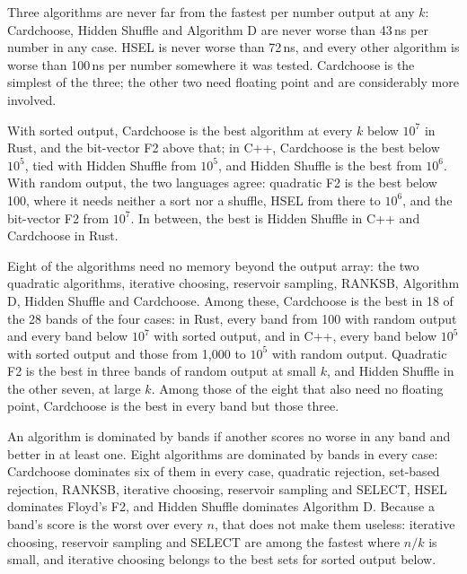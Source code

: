 \documentclass[letterpaper,11pt]{article}
\begin{document}
\begin{table}
    \small
    
    \caption{Rust, sorted order: the best algorithms by worst time per
    number output in each band of \(k\)}\label{bandsrustsorted}
\end{table}

Three algorithms are never far from the fastest per number output at
any \(k\): Cardchoose, Hidden Shuffle and Algorithm D are never worse
than 43\,ns per number in any case. HSEL is never worse than 72\,ns,
and every other algorithm is worse than 100\,ns per number somewhere it
was tested. Cardchoose is the simplest of the three; the other two need
floating point and are considerably more involved.

With sorted output, Cardchoose is the best algorithm at every \(k\)
below \(10^7\) in Rust, and the bit-vector F2 above that; in C++,
Cardchoose is the best below \(10^5\), tied with Hidden Shuffle from
\(10^5\), and Hidden Shuffle is the best from \(10^6\). With random
output, the two languages agree: quadratic F2 is the best below 100,
where it needs neither a sort nor a shuffle, HSEL from there to
\(10^6\), and the bit-vector F2 from \(10^7\). In between, the best is
Hidden Shuffle in C++ and Cardchoose in Rust.

Eight of the algorithms need no memory beyond the output array: the two
quadratic algorithms, iterative choosing, reservoir sampling, RANKSB,
Algorithm D, Hidden Shuffle and Cardchoose. Among these, Cardchoose is
the best in 18 of the 28 bands of the four cases: in Rust, every band
from 100 with random output and every band below \(10^7\) with sorted
output, and in C++, every band below \(10^5\) with sorted output and
those from 1,000 to \(10^5\) with random output. Quadratic F2 is the
best in three bands of random output at small \(k\), and Hidden Shuffle
in the other seven, at large \(k\). Among those of the eight that also
need no floating point, Cardchoose is the best in every band but those
three.

An algorithm is dominated by bands if another scores no worse in any
band and better in at least one. Eight algorithms are dominated by
bands in every case: Cardchoose dominates six of them in every case,
quadratic rejection, set-based rejection, RANKSB, iterative choosing,
reservoir sampling and SELECT, HSEL dominates Floyd's F2, and Hidden
Shuffle dominates Algorithm D. Because a band's score is
the worst over every \(n\), that does not make them useless: iterative
choosing, reservoir sampling and SELECT are among the fastest where
\(n/k\) is small, and iterative choosing belongs to the best sets for
sorted output below.
\end{document}
